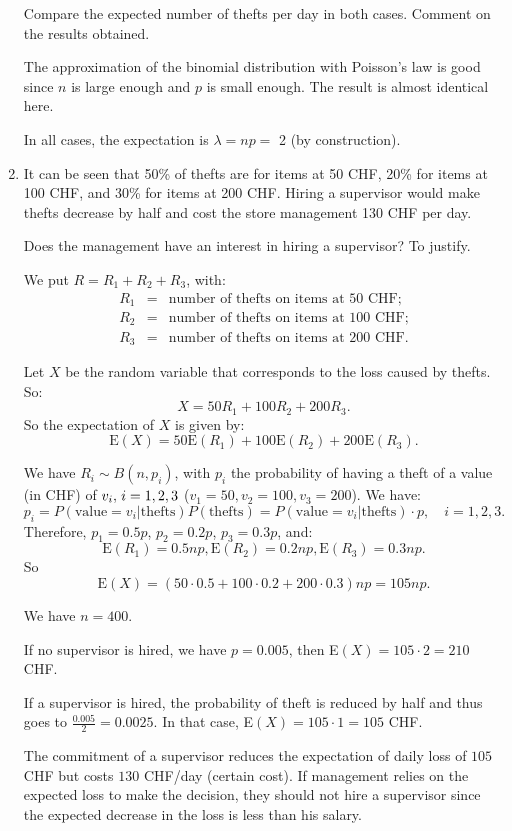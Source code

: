 \documentclass[12pt,thmsa]{article}
\begin{document}
\begin{enumerate}
\noindent Compare the expected number of thefts per day in both cases. Comment on the results obtained.

The approximation of the binomial distribution with Poisson's law is good since $ n $ is large enough and $ p $ is small enough. The result is almost identical here.

In all cases, the expectation is $ \lambda = np = $ 2 (by construction).

\item It can be seen that 50\% of thefts are for items at 50 CHF, 20\% for items at 100 CHF, and 30\% for items at 200 CHF. Hiring a supervisor would make thefts decrease by half and cost the store management 130 CHF per day.

\noindent Does the management have an interest in hiring a supervisor? To justify.

We put $R=R_1+R_2+R_3$, with:
 \begin{eqnarray*}
R_{1} & = & \text{number of thefts on items at 50 CHF}; \nonumber \\
R_{2} & = & \text{number of thefts on items at 100 CHF}; \nonumber \\
R_{3} & = & \text{number of thefts on items at 200 CHF}. \nonumber %
\end{eqnarray*}

Let $X$ be the random variable that corresponds to the loss caused by thefts. So:
$$X=50R_{1}+100R_{2}+200R_{3}.$$
So the expectation of $X$ is given by:
$$\text{E}(X)=50\text{E}(R_{1})+100\text{E}(R_{2})+200\text{E}(R_{3}).$$

We have $R_i \sim B(n,p_i)$, with $ p_i $ the probability of having a theft of a value (in CHF) of $v_i, \hspace{0.05cm} i=1,2,3$ ($v_1=50, v_2=100, v_3=200$). We have:
$$p_i=P(\text{value}=v_i|\text{thefts})P(\text{thefts})=P(\text{value}=v_i|\text{thefts})\cdot p, \quad i=1,2,3.$$
Therefore, $p_1=0.5p$, $p_2=0.2p$, $p_3=0.3p$, and:
$$\text{E}(R_{1})=0.5np, \text{E}(R_{2})=0.2np, \text{E}(R_{3})=0.3np.$$
So 
$$ \text{E}(X)=(50 \cdot 0.5 + 100 \cdot 0.2 + 200 \cdot 0.3)np=105np.$$

We have $n=400$.

If no supervisor is hired, we have $p=0.005$, then E$(X)=105 \cdot 2=210$ CHF.

If a supervisor is hired, the probability of theft is reduced by half and thus goes to \linebreak $\frac{0.005}{2}=0.0025$. In that case, E$(X)=105 \cdot 1=105$ CHF.

The commitment of a supervisor reduces the expectation of daily loss of $105$ CHF but costs $130$ CHF/day (certain cost). If management relies on the expected loss to make the decision, they should not hire a supervisor since the expected decrease in the loss is less than his salary.
\end{enumerate}
\end{document}
